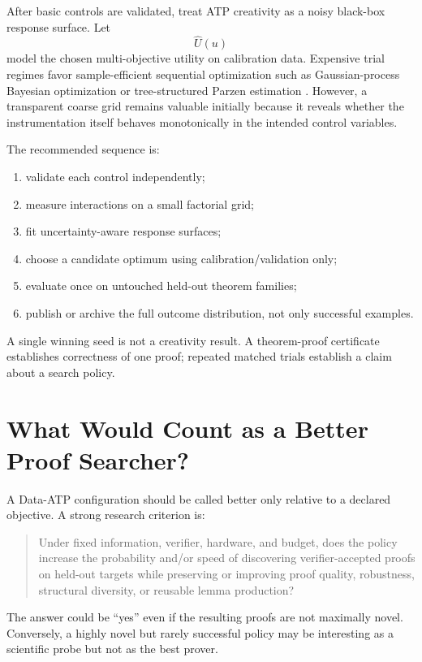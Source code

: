 \documentclass[11pt]{article}
\theoremstyle{datatheorem}
\theoremstyle{definition}
\begin{document}
After basic controls are validated, treat ATP creativity as a noisy black-box response surface. Let
\[
\widehat{U}(u)
\]
model the chosen multi-objective utility on calibration data. Expensive trial regimes favor sample-efficient sequential optimization such as Gaussian-process Bayesian optimization or tree-structured Parzen estimation \cite{snoek2012,bergstra2011}. However, a transparent coarse grid remains valuable initially because it reveals whether the instrumentation itself behaves monotonically in the intended control variables.

The recommended sequence is:
\begin{enumerate}
\item validate each control independently;
\item measure interactions on a small factorial grid;
\item fit uncertainty-aware response surfaces;
\item choose a candidate optimum using calibration/validation only;
\item evaluate once on untouched held-out theorem families;
\item publish or archive the full outcome distribution, not only successful examples.
\end{enumerate}

A single winning seed is not a creativity result. A theorem-proof certificate establishes correctness of one proof; repeated matched trials establish a claim about a search policy.

\section{What Would Count as a Better Proof Searcher?}

A Data-ATP configuration should be called better only relative to a declared objective. A strong research criterion is:
\begin{quote}
Under fixed information, verifier, hardware, and budget, does the policy increase the probability and/or speed of discovering verifier-accepted proofs on held-out targets while preserving or improving proof quality, robustness, structural diversity, or reusable lemma production?
\end{quote}

The answer could be ``yes'' even if the resulting proofs are not maximally novel. Conversely, a highly novel but rarely successful policy may be interesting as a scientific probe but not as the best prover.
\end{document}
